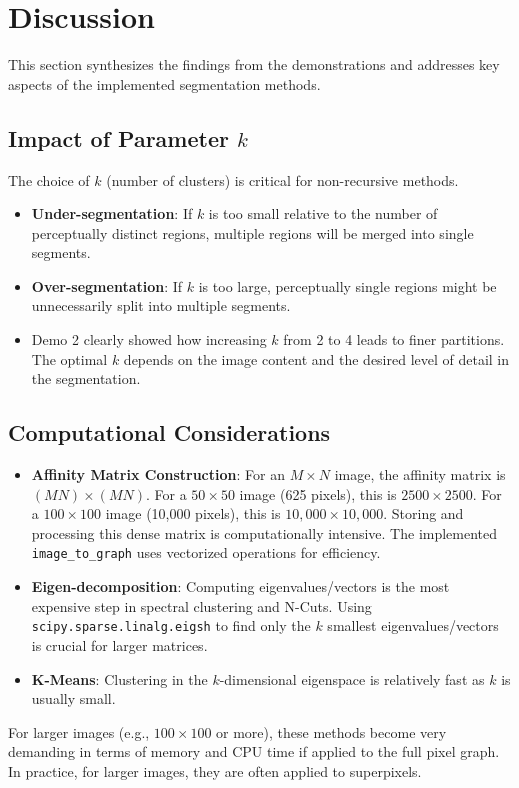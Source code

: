 \documentclass[12pt,a4paper]{article}
\begin{document}
{\section{Discussion}
This section synthesizes the findings from the demonstrations and addresses key aspects of the implemented segmentation methods.

\subsection{Impact of Parameter $k$}
The choice of $k$ (number of clusters) is critical for non-recursive methods.
\begin{itemize}
    \item \textbf{Under-segmentation}: If $k$ is too small relative to the number of perceptually distinct regions, multiple regions will be merged into single segments.
    \item \textbf{Over-segmentation}: If $k$ is too large, perceptually single regions might be unnecessarily split into multiple segments.
    \item Demo 2 clearly showed how increasing $k$ from 2 to 4 leads to finer partitions. The optimal $k$ depends on the image content and the desired level of detail in the segmentation.
\end{itemize}

\subsection{Computational Considerations}
\begin{itemize}
    \item \textbf{Affinity Matrix Construction}: For an $M \times N$ image, the affinity matrix is $(MN) \times (MN)$. For a $50 \times 50$ image (625 pixels), this is $2500 \times 2500$. For a $100 \times 100$ image (10,000 pixels), this is $10,000 \times 10,000$. Storing and processing this dense matrix is computationally intensive. The implemented \texttt{image\_to\_graph} uses vectorized operations for efficiency.
    \item \textbf{Eigen-decomposition}: Computing eigenvalues/vectors is the most expensive step in spectral clustering and N-Cuts. Using \texttt{scipy.sparse.linalg.eigsh} to find only the $k$ smallest eigenvalues/vectors is crucial for larger matrices. 
    \item \textbf{K-Means}: Clustering in the $k$-dimensional eigenspace is relatively fast as $k$ is usually small. 
\end{itemize}
For larger images (e.g., $100 \times 100$ or more), these methods become very demanding in terms of memory and CPU time if applied to the full pixel graph. In practice, for larger images, they are often applied to superpixels.




}
\end{document}
